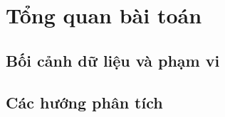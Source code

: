 \section{Tổng quan bài toán}

\subsection{Bối cảnh dữ liệu và phạm vi}


\subsection{Các hướng phân tích}



